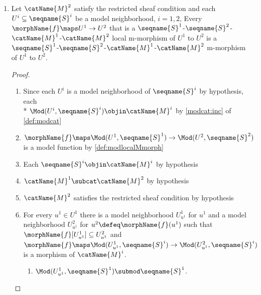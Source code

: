 \documentclass{article}
\begin{document}
\begin{lemma}
\begin{enumerate}
\begin{proof}
\begin{enumerate}
\begin{enumerate}
\item
Each $U^i \subseteq U^i$.

\item
$\morphName{f}[U^1] \subseteq U^2$.
\end{enumerate}
\end{enumerate}
\end{proof}

\item
\label{M-morph:opencatlocalismorph}
Let $\catName{M}^2$ satisfy the restricted sheaf condition and each
$U^i \subseteq \seqname{S}^i$ be a model neighborhood, $i=1,2$, Every
$\morphName{f} \maps U^1 \to U^2$ that is a
$\seqname{S}^1$-$\seqname{S}^2$-$\catName{M}^1$-$\catName{M}^2$ local
m-morphism of $U^1$ to $U^2$ is a
$\seqname{S}^1$-$\seqname{S}^2$-$\catName{M}^1$-$\catName{M}^2$
m-morphism of $U^1$ to $U^2$.

\begin{proof}
\leavevmode
\begin{enumerate}
\item
Since each $U^i$ is a model neighborhood of $\seqname{S}^i$ by hypothesis,
each \\*
$\Mod(U^i,\seqname{S}^i) \objin \catName{M}^i$ by \cref{modcat:inc}
of
{
  \showlabelsinline
  \cref{def:modcat}
}

\item
$
  \morphName{f} \maps
  \Mod(U^1,\seqname{S}^1) \to
  \Mod(U^2,\seqname{S}^2)
$
is a model function by \cref{def:modlocalMmorph}

\item
Each $\seqname{S}^i \objin \catName{M}^i$ by hypothesis

\item
$\catName{M}^1 \subcat \catName{M}^2$ by hypothesis

\item
$\catName{M}^2$ satisfies the restricted sheaf condition by hypothesis

\item
For every $u^1 \in U^1$ there is a model neighborhood $U^1_{u^1}$ for
$u^1$ and a model neighborhood $U^2_{u^1}$ for
$u^2 \defeq \morphName{f}(u^1)$ such that
$\morphName{f}[U^1_{u^1}] \subseteq U^2_{u^1}$ and
$
  \morphName{f} \maps
  \Mod(U^1_{u^1},\seqname{S}^i) \to
  \Mod(U^2_{u^1},\seqname{S}^i)
$
is a morphism of $\catName{M}^i$.

\begin{enumerate}
\item
$\Mod(U^1_{u^1},\seqname{S}^1) \submod \seqname{S}^1$.


\end{enumerate}
\end{enumerate}
\end{proof}
\end{enumerate}
\end{lemma}
\end{document}
